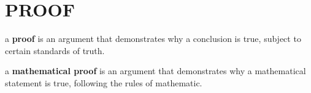 \documentclass{article}
\begin{document}
\section{PROOF}
a \textbf{proof} is an argument that demonstrates why a conclusion is true,
subject to certain standards of truth.

a \textbf{mathematical proof} is an argument that demonstrates why
a mathematical statement is true, following the rules of mathematic.
\end{document}
